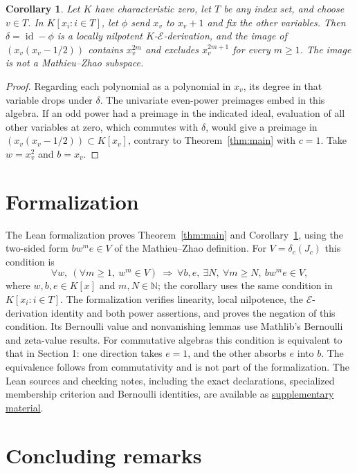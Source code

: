 \documentclass[11pt]{article}
\newtheorem{corollary}[theorem]{Corollary}
\newcommand{\E}{\mathcal{E}}
\begin{document}
\begin{corollary}\label{cor:variables}
Let $K$ have characteristic zero, let $T$ be any index set, and choose
$v\in T$. In $K[x_i:i\in T]$, let $\phi$ send $x_v$ to $x_v+1$ and fix
the other variables. Then $\delta=\operatorname{id}-\phi$ is a locally
nilpotent $K$-$\E$-derivation, and the image of $(x_v(x_v-1/2))$ contains $x_v^{2m}$ and
excludes $x_v^{2m+1}$ for every $m\ge1$. The image is not a Mathieu--Zhao subspace.
\end{corollary}
\begin{proof}
Regarding each polynomial as a polynomial in $x_v$, its degree in that
variable drops under $\delta$. The univariate even-power preimages embed
in this algebra. If an odd power had a preimage in the indicated ideal,
evaluation of all other variables at zero, which commutes with $\delta$,
would give a preimage in $(x_v(x_v-1/2))\subset K[x_v]$, contrary to
Theorem~\ref{thm:main} with $c=1$. Take $w=x_v^2$ and $b=x_v$.
\end{proof}

\section{Formalization}

The Lean formalization proves Theorem~\ref{thm:main} and
Corollary~\ref{cor:variables}, using the two-sided form $bw^me\in V$
of the Mathieu--Zhao definition. For $V=\delta_c(J_c)$ this condition is
\[
 \forall w,\ (\forall m\ge1,\ w^m\in V)\ \Longrightarrow\
 \forall b,e,\ \exists N,\ \forall m\ge N,\ bw^me\in V,
\]
where $w,b,e\in K[x]$ and $m,N\in\mathbb N$; the corollary uses the same
condition in $K[x_i:i\in T]$. The formalization verifies linearity, local
nilpotence, the $\E$-derivation identity and both power assertions, and
proves the negation of this condition. Its Bernoulli value and
nonvanishing lemmas use Mathlib's Bernoulli and zeta-value results.
For commutative algebras this condition is equivalent to that in Section 1:
one direction takes $e=1$, and the other absorbs $e$ into $b$.
The equivalence follows from commutativity and is not part of the formalization.
The Lean sources and checking notes, including the exact declarations,
specialized membership criterion and Bernoulli identities, are available as
\href{https://github.com/6/clank-lab/tree/lned-counterexample-v1/results/lned-counterexample/lean}{supplementary material}.

\section{Concluding remarks}
\end{document}
